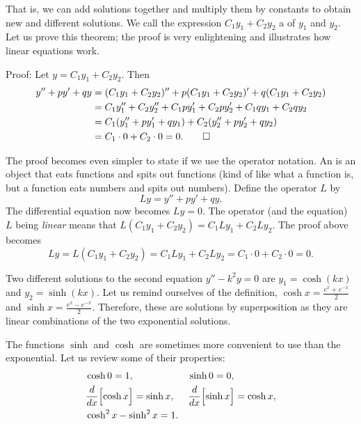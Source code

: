 That is, we can add solutions together and multiply them by constants to
obtain new and different solutions.  We call
the expression $C_1 y_1 + C_2 y_2$ a
\emph{} of $y_1$ and $y_2$.
Let us
prove this theorem; the
proof is very enlightening and illustrates how linear equations work.

\medskip

Proof:
Let 
$y = C_1 y_1 + C_2 y_2$.  Then
\begin{equation*}
\begin{split}
y'' + py' + qy & =
(C_1 y_1 + C_2 y_2)'' + p(C_1 y_1 + C_2 y_2)' + q(C_1 y_1 + C_2 y_2) \\
& = C_1 y_1'' + C_2 y_2'' + C_1 p y_1' + C_2 p y_2' + C_1 q y_1 + C_2 q y_2 \\
& = C_1 ( y_1'' + p y_1' + q y_1 ) + C_2 ( y_2'' + p y_2' + q y_2 ) \\
& = C_1 \cdot 0 + C_2 \cdot 0 = 0 . \qed
\end{split}
\end{equation*}

\medskip

The proof becomes even simpler to state if we use the
operator notation.
An \emph{} is an object that eats functions and spits out functions (kind of
like what a function is, but a function eats numbers and spits out numbers).
Define the operator $L$ by
\begin{equation*}
Ly = y'' + py' + qy .
\end{equation*}
The differential equation now becomes $Ly=0$.
The operator (and the equation)
$L$ being \emph{linear} means that $L(C_1y_1 + C_2y_2) = 
C_1 Ly_1 + C_2 Ly_2$.  The proof above becomes
\begin{equation*}
Ly = L(C_1y_1 + C_2y_2) = 
C_1 Ly_1 + C_2 Ly_2 = C_1 \cdot 0 + C_2 \cdot 0 = 0 .
\end{equation*}

\medskip

Two different solutions to the second equation $y'' - k^2y = 0$ are
$y_1 = \cosh (kx)$ and $y_2 = \sinh (kx)$.  Let us remind ourselves of the
definition, $\cosh x = \frac{e^x  + e^{-x}}{2}$ and
$\sinh x = \frac{e^x - e^{-x}}{2}$.  Therefore, these are solutions by
superposition as they
are linear combinations of the two
exponential solutions.

The functions $\sinh$ and $\cosh$ are sometimes more convenient to use than the
exponential.  Let us review some of their properties:
\begin{align*}
& \cosh 0  = 1 , &   & \sinh 0 = 0 , \\
& \frac{d}{dx} \Bigl[ \cosh x \Bigr] = \sinh x , &  & \frac{d}{dx} \Bigl[ \sinh x \Bigr] = \cosh x , \\
& \cosh^2 x - \sinh^2 x = 1 .
\end{align*}


